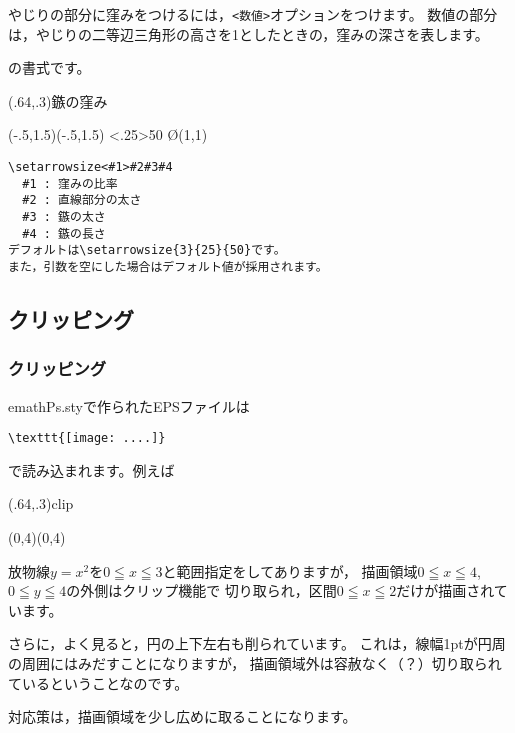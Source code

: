 \documentclass[a4j]{jarticle}
\begin{document}
やじりの部分に窪みをつけるには，\verb+<数値>+オプションをつけます。
数値の部分は，やじりの二等辺三角形の高さを1としたときの，窪みの深さを表します。

の書式です。

\begin{showEx}(.64,.3){鏃の窪み}
\begin{pszahyou*}[ul=10mm](-.5,1.5)(-.5,1.5)
  \def\A{(1,1)}
  \setarrowsize<.25>{}{50}{}
  \ArrowLine\O\A
\end{pszahyou*}
\end{showEx}

\begin{boxnote}
\begin{verbatim}
\setarrowsize<#1>#2#3#4
  #1 : 窪みの比率
  #2 : 直線部分の太さ
  #3 : 鏃の太さ
  #4 : 鏃の長さ
デフォルトは\setarrowsize{3}{25}{50}です。
また，引数を空にした場合はデフォルト値が採用されます。
\end{verbatim}
\end{boxnote}


\subsection{クリッピング}
\subsubsection{クリッピング}
\textsf{emathPs.sty}で作られたEPSファイルは
\begin{jquote}
\begin{verbatim}
\texttt{[image: ....]}
\end{verbatim}
\end{jquote}
で読み込まれます。例えば

\begin{showEx}(.64,.3){clip}
\begin{pszahyou*}[ul=20pt](0,4)(0,4)
\end{pszahyou*}
\end{showEx}

放物線$y=x^2$を$0\leqq x\leqq 3$と範囲指定をしてありますが，
描画領域$0\leqq x\leqq 4$, $0\leqq y\leqq 4$の外側はクリップ機能で
切り取られ，区間$0\leqq x\leqq 2$だけが描画されています。

さらに，よく見ると，円の上下左右も削られています。
これは，線幅1ptが円周の周囲にはみだすことになりますが，
描画領域外は容赦なく（？）切り取られているということなのです。

対応策は，描画領域を少し広めに取ることになります。
\end{document}

